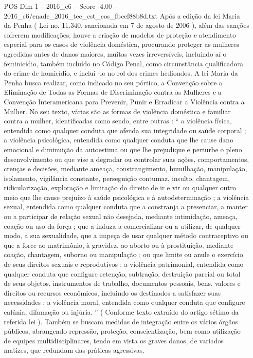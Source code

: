 \begin{textsample}{POS Dim 1 – 2016\_c6 – Score -4.00 – 2016\_c6/enade\_2016\_tec\_est\_cos\_fbccf88b8d.txt}
Após a edição da lei Maria da Penha ( Lei no. 11.340, sancionada em 7 de agosto de 2006 ), além das sanções sofrerem modificações, houve a criação de modelos de proteção e atendimento especial para os casos de violência doméstica, procurando proteger as mulheres agredidas antes de danos maiores, muitas vezes irreversíveis, incluindo aí o feminicídio, também incluído no Código Penal, como circunstância qualificadora do crime de homicídio, e incluí -lo no rol dos crimes hediondos.
A lei Maria da Penha busca realizar, como indicado no seu pórtico, a Convenção sobre a Eliminação de Todas as Formas de Discriminação contra as Mulheres e a Convenção Interamericana para Prevenir, Punir e Erradicar a Violência contra a Mulher.
No seu texto, várias são as formas de violência doméstica e familiar contra a mulher, identificadas como sendo, entre outras : “ a violência física, entendida como qualquer conduta que ofenda sua integridade ou saúde corporal ; a violência psicológica, entendida como qualquer conduta que lhe cause dano emocional e diminuição da autoestima ou que lhe prejudique e perturbe o pleno desenvolvimento ou que vise a degradar ou controlar suas ações, comportamentos, crenças e decisões, mediante ameaça, constrangimento, humilhação, manipulação, isolamento, vigilância constante, perseguição contumaz, insulto, chantagem, ridicularização, exploração e limitação do direito de ir e vir ou qualquer outro meio que lhe cause prejuízo à saúde psicológica e à autodeterminação ; a violência sexual, entendida como qualquer conduta que a constranja a presenciar, a manter ou a participar de relação sexual não desejada, mediante intimidação, ameaça, coação ou uso da força ; que a induza a comercializar ou a utilizar, de qualquer modo, a sua sexualidade, que a impeça de usar qualquer método contraceptivo ou que a force ao matrimônio, à gravidez, ao aborto ou à prostituição, mediante coação, chantagem, suborno ou manipulação ; ou que limite ou anule o exercício de seus direitos sexuais e reprodutivos ; a violência patrimonial, entendida como qualquer conduta que configure retenção, subtração, destruição parcial ou total de seus objetos, instrumentos de trabalho, documentos pessoais, bens, valores e direitos ou recursos econômicos, incluindo os destinados a satisfazer suas necessidades ; a violência moral, entendida como qualquer conduta que configure calúnia, difamação ou injúria. ” ( Conforme texto extraído do artigo sétimo da referida lei ).
Também se buscam medidas de integração entre os vários órgãos públicos, abrangendo repressão, proteção, conscientização, bem como utilização de equipes multidisciplinares, tendo em vista os graves danos, de variados matizes, que redundam das práticas agressivas.

\end{textsample}
